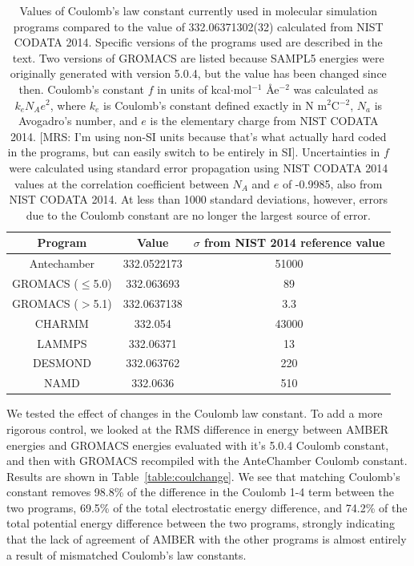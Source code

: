 \begin{table}
\caption{Values of Coulomb's law constant currently used in molecular
  simulation programs compared to the value of 332.06371302(32)
  calculated from NIST CODATA 2014. Specific versions of the programs
  used are described in the text. Two versions of GROMACS are listed
  because SAMPL5 energies were originally generated with version
  5.0.4, but the value has been changed since then. Coulomb's constant
  $f$ in units of kcal$\cdot$mol$^{-1}$ \AA e$^{-2}$ was calculated as
  $k_e N_A e^2$, where $k_e$ is Coulomb's constant defined exactly in
  N m$^2$C$^{-2}$, $N_a$ is Avogadro's number, and $e$ is the
  elementary charge from NIST CODATA 2014. [MRS: I'm using non-SI
    units because that's what actually hard coded in the programs, but
    can easily switch to be entirely in SI]. Uncertainties in $f$ were
  calculated using standard error propagation using NIST CODATA 2014
  values at the correlation coefficient between $N_A$ and $e$ of
  -0.9985, also from NIST CODATA 2014. At less than 1000 standard
  deviations, however, errors due to the Coulomb constant are no
  longer the largest source of error.\label{tab:delfromnist}}
\begin{tabular}{|ccc|}
\hline
Program & Value & $\sigma$ from NIST 2014 reference value \\
\hline
Antechamber &  332.0522173 & 51000 \\
GROMACS ($\leq$5.0) & 332.063693 & 89 \\
GROMACS ($>$5.1) & 332.0637138 & 3.3 \\ 
CHARMM & 332.054 & 43000 \\
LAMMPS & 332.06371 &  13 \\
DESMOND & 332.063762 & 220 \\
NAMD & 332.0636 & 510 \\
\hline
\end{tabular}
\end{table}

We tested the effect of changes in the Coulomb law constant.  To add a
more rigorous control, we looked at the RMS difference in energy
between AMBER energies and GROMACS energies evaluated with it's 5.0.4
Coulomb constant, and then with GROMACS recompiled with the
AnteChamber Coulomb constant.  Results are shown in
Table~\ref{table:coulchange}. We see that matching Coulomb's constant
removes 98.8\% of the difference in the Coulomb 1-4 term between the
two programs, 69.5\% of the total electrostatic energy difference, and
74.2\% of the total potential energy difference between the two
programs, strongly indicating that the lack of agreement of AMBER with
the other programs is almost entirely a result of mismatched Coulomb's
law constants.

